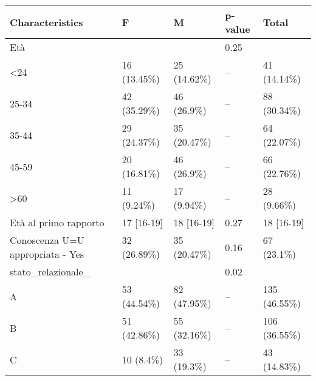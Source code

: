 
\begin{tabular}{lllll}
\toprule
Characteristics & F & M & p-value & Total\\
\midrule
Età &  &  & 0.25 & \\
\hspace{1em}<24 & 16 (13.45\%) & 25 (14.62\%) & -- & 41 (14.14\%)\\
\hspace{1em}25-34 & 42 (35.29\%) & 46 (26.9\%) & -- & 88 (30.34\%)\\
\hspace{1em}35-44 & 29 (24.37\%) & 35 (20.47\%) & -- & 64 (22.07\%)\\
\hspace{1em}45-59 & 20 (16.81\%) & 46 (26.9\%) & -- & 66 (22.76\%)\\
\hspace{1em}>60 & 11 (9.24\%) & 17 (9.94\%) & -- & 28 (9.66\%)\\
Età al primo rapporto & 17 [16-19] & 18 [16-19] & 0.27 & 18 [16-19]\\
Conoscenza U=U appropriata - Yes & 32 (26.89\%) & 35 (20.47\%) & 0.16 & 67 (23.1\%)\\
stato\_relazionale\_ &  &  & 0.02 & \\
\hspace{1em}A & 53 (44.54\%) & 82 (47.95\%) & -- & 135 (46.55\%)\\
\hspace{1em}B & 51 (42.86\%) & 55 (32.16\%) & -- & 106 (36.55\%)\\
\hspace{1em}C & 10 (8.4\%) & 33 (19.3\%) & -- & 43 (14.83\%)\\
\bottomrule
\end{tabular}

